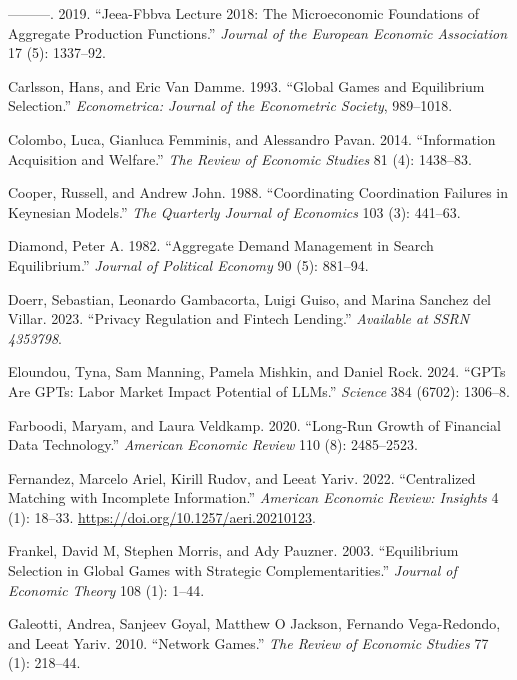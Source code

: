 \documentclass[
]{article}
\newlength{\cslhangindent}
\newenvironment{CSLReferences}[2] %
 {\begin{list}{}{%
  \setlength{\itemindent}{0pt}
  \setlength{\leftmargin}{0pt}
  \setlength{\parsep}{0pt}
  \ifodd #1
   \setlength{\leftmargin}{\cslhangindent}
   \setlength{\itemindent}{-1\cslhangindent}
  \fi
  \setlength{\itemsep}{#2\baselineskip}}}
 {\end{list}}
\theoremstyle{plain}
\theoremstyle{definition}
\theoremstyle{remark}
\begin{document}
\begin{CSLReferences}{1}{0}
---------. 2019. {``Jeea-Fbbva Lecture 2018: The Microeconomic
Foundations of Aggregate Production Functions.''} \emph{Journal of the
European Economic Association} 17 (5): 1337--92.

Carlsson, Hans, and Eric Van Damme. 1993. {``Global Games and
Equilibrium Selection.''} \emph{Econometrica: Journal of the Econometric
Society}, 989--1018.

Colombo, Luca, Gianluca Femminis, and Alessandro Pavan. 2014.
{``Information Acquisition and Welfare.''} \emph{The Review of Economic
Studies} 81 (4): 1438--83.

Cooper, Russell, and Andrew John. 1988. {``Coordinating Coordination
Failures in Keynesian Models.''} \emph{The Quarterly Journal of
Economics} 103 (3): 441--63.

Diamond, Peter A. 1982. {``Aggregate Demand Management in Search
Equilibrium.''} \emph{Journal of Political Economy} 90 (5): 881--94.

Doerr, Sebastian, Leonardo Gambacorta, Luigi Guiso, and Marina Sanchez
del Villar. 2023. {``Privacy Regulation and Fintech Lending.''}
\emph{Available at SSRN 4353798}.

Eloundou, Tyna, Sam Manning, Pamela Mishkin, and Daniel Rock. 2024.
{``GPTs Are GPTs: Labor Market Impact Potential of LLMs.''}
\emph{Science} 384 (6702): 1306--8.

Farboodi, Maryam, and Laura Veldkamp. 2020. {``Long-Run Growth of
Financial Data Technology.''} \emph{American Economic Review} 110 (8):
2485--2523.

Fernandez, Marcelo Ariel, Kirill Rudov, and Leeat Yariv. 2022.
{``Centralized Matching with Incomplete Information.''} \emph{American
Economic Review: Insights} 4 (1): 18--33.
\url{https://doi.org/10.1257/aeri.20210123}.

Frankel, David M, Stephen Morris, and Ady Pauzner. 2003. {``Equilibrium
Selection in Global Games with Strategic Complementarities.''}
\emph{Journal of Economic Theory} 108 (1): 1--44.

Galeotti, Andrea, Sanjeev Goyal, Matthew O Jackson, Fernando
Vega-Redondo, and Leeat Yariv. 2010. {``Network Games.''} \emph{The
Review of Economic Studies} 77 (1): 218--44.


\end{CSLReferences}
\end{document}
